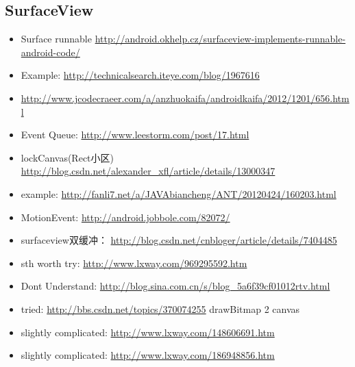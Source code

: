 \documentclass[9pt,b5paper]{article}
\begin{document}
\subsection{SurfaceView}
\label{sec-2-6}
\begin{itemize}
\item Surface runnable \url{http://android.okhelp.cz/surfaceview-implements-runnable-android-code/}
\item Example: \url{http://technicalsearch.iteye.com/blog/1967616}
\item \url{http://www.jcodecraeer.com/a/anzhuokaifa/androidkaifa/2012/1201/656.html}
\item Event Queue: \url{http://www.leestorm.com/post/17.html}
\item lockCanvas(Rect小区) \url{http://blog.csdn.net/alexander_xfl/article/details/13000347}
\item example: \url{http://fanli7.net/a/JAVAbiancheng/ANT/20120424/160203.html}
\item MotionEvent: \url{http://android.jobbole.com/82072/}
\item surfaceview双缓冲： \url{http://blog.csdn.net/cnbloger/article/details/7404485}
\item sth worth try: \url{http://www.lxway.com/969295592.htm}
\item Dont Understand: \url{http://blog.sina.com.cn/s/blog_5a6f39cf01012rtv.html}
\item tried: \url{http://bbs.csdn.net/topics/370074255} drawBitmap 2 canvas
\item slightly complicated: \url{http://www.lxway.com/148606691.htm}
\item slightly complicated: \url{http://www.lxway.com/186948856.htm}
\end{itemize}
\end{document}
